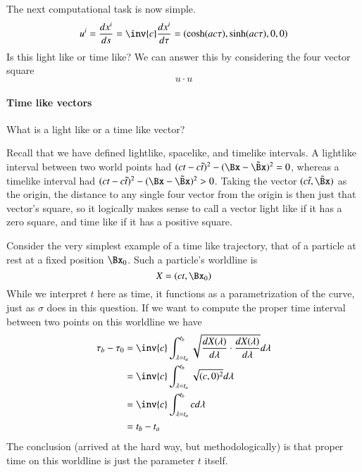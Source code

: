 {%
The next computational task is now simple.
\begin{equation}\label{eqn:relativisticElectrodynamicsT2:77}
u^i
= \frac{dx^i}{ds}
= \inv{c} \frac{dx^i}{d\tau}
= ( \cosh( a c \tau ), \sinh( a c \tau ), 0, 0) \\
\end{equation}
%
Is this light like or time like?  We can answer this by considering the four vector square
%
\begin{equation}\label{eqn:relativisticElectrodynamicsT2:80}
u \cdot u
\end{equation}
%
\paragraph{Time like vectors}
%
What is a light like or a time like vector?

Recall that we have defined lightlike, spacelike, and timelike intervals.  A lightlike interval between two world points had \((ct - c\tilde{t})^2 - (\Bx -\tilde{\Bx})^2 = 0\), whereas a timelike interval had \((ct - c\tilde{t})^2 - (\Bx -\tilde{\Bx})^2 > 0\).  Taking the vector \((c \tilde{t}, \tilde{\Bx})\) as the origin, the distance to any single four vector from the origin is then just that vector's square, so it logically makes sense to call a vector light like if it has a zero square, and time like if it has a positive square.

Consider the very simplest example of a time like trajectory, that of a particle at rest at a fixed position \(\Bx_0\).  Such a particle's worldline is
%
\begin{equation}\label{eqn:relativisticElectrodynamicsT2:71}
X = ( c t, \Bx_0 )
\end{equation}
%
While we interpret \(t\) here as time, it functions as a parametrization of the curve, just as \(\sigma\) does in this question.  If we want to compute the proper time interval between two points on this worldline we have
%
\begin{equation}\label{eqn:relativisticElectrodynamicsT2:2140}
\begin{aligned}
\tau_b - \tau_0
&=
\inv{c} \int_{\lambda = t_a}^{t_b} \sqrt{ \frac{dX(\lambda)}{d\lambda} \cdot \frac{dX(\lambda)}{d\lambda} } d\lambda \\
&=
\inv{c} \int_{\lambda = t_a}^{t_b} \sqrt{ (c, 0)^2 } d\lambda \\
&=
\inv{c} \int_{\lambda = t_a}^{t_b} c d\lambda \\
&= t_b - t_a
\end{aligned}
\end{equation}
%
The conclusion (arrived at the hard way, but methodologically) is that proper time on this worldline is just the parameter \(t\) itself.

}
